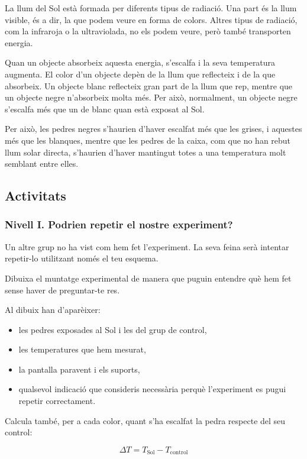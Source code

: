 La llum del Sol està formada per diferents tipus de radiació. Una part és la llum visible, és a dir, la que podem veure en forma de colors. Altres tipus de radiació, com la infraroja o la ultraviolada, no els podem veure, però també transporten energia.

Quan un objecte absorbeix aquesta energia, s’escalfa i la seva temperatura augmenta. El color d’un objecte depèn de la llum que reflecteix i de la que absorbeix. Un objecte blanc reflecteix gran part de la llum que rep, mentre que un objecte negre n’absorbeix molta més. Per això, normalment, un objecte negre s’escalfa més que un de blanc quan està exposat al Sol.

Per això, les pedres negres s’haurien d’haver escalfat més que les grises, i aquestes més que les blanques, mentre que les pedres de la caixa, com que no han rebut llum solar directa, s’haurien d’haver mantingut totes a una temperatura molt semblant entre elles.

\subsection{Activitats}

\subsubsection{Nivell I. Podrien repetir el nostre experiment?}

Un altre grup no ha vist com hem fet l’experiment. La seva feina serà intentar repetir-lo utilitzant només el teu esquema.

Dibuixa el muntatge experimental de manera que puguin entendre què hem fet sense haver de preguntar-te res.

Al dibuix han d’aparèixer:

\begin{itemize}
    \item les pedres exposades al Sol i les del grup de control,
    \item les temperatures que hem mesurat,
    \item la pantalla paravent i els suports,
    \item qualsevol indicació que consideris necessària perquè l’experiment es pugui repetir correctament.
\end{itemize}

Calcula també, per a cada color, quant s’ha escalfat la pedra respecte del seu control:

\[
\Delta T = T_{\text{Sol}} - T_{\text{control}}
\]

